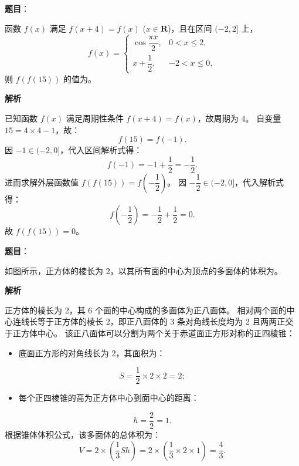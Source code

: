 \begin{answer}

\textbf{题目}：

函数 $f(x)$ 满足 $f(x + 4) = f(x)$ ($x \in \mathbf{R}$)，且在区间 $(-2, 2]$ 上，
\nopagebreak[4]
\[f(x) = \begin{cases} \cos\dfrac{\pi x}{2}, & 0 < x \leqslant 2, \\ x + \dfrac{1}{2}, & -2 < x \leqslant 0, \end{cases}\]
则 $f(f(15))$ 的值为\gkblank{}。

\textbf{解析}

已知函数 $f(x)$ 满足周期性条件 $f(x + 4) = f(x)$，故周期为 4。
自变量 $15 = 4 \times 4 - 1$，故：
\nopagebreak[4]
\[f(15) = f(-1).\]
因 $-1 \in (-2, 0]$，代入区间解析式得：
\nopagebreak[4]
\[f(-1) = -1 + \frac{1}{2} = -\frac{1}{2}.\]
进而求解外层函数值 $f(f(15)) = f\left(-\dfrac{1}{2}\right)$。
因 $-\dfrac{1}{2} \in (-2, 0]$，代入解析式得：
\nopagebreak[4]
\[f\left(-\frac{1}{2}\right) = -\frac{1}{2} + \frac{1}{2} = 0.\]
故 $f(f(15)) = 0$。


\end{answer}
\begin{answer}

\textbf{题目}：

如图所示，正方体的棱长为 2，以其所有面的中心为顶点的多面体的体积为\gkblank{}。
\nopagebreak[4]
\begin{center}\end{center}
\nopagebreak[4]
\textbf{解析}

正方体的棱长为 2，其 6 个面的中心构成的多面体为正八面体。
相对两个面的中心连线长等于正方体的棱长 2，即正八面体的 3 条对角线长度均为 2 且两两正交于正方体中心。
该正八面体可以分割为两个关于赤道面正方形对称的正四棱锥：
\begin{itemize}
\item 底面正方形的对角线长为 2，其面积为：
\end{itemize}
\nopagebreak[4]
\[S = \frac{1}{2} \times 2 \times 2 = 2;\]
\begin{itemize}
\item 每个正四棱锥的高为正方体中心到面中心的距离：
\end{itemize}
\nopagebreak[4]
\[h = \frac{2}{2} = 1.\]
根据锥体体积公式，该多面体的总体积为：
\nopagebreak[4]
\[V = 2 \times \left(\frac{1}{3} S h\right) = 2 \times \left(\frac{1}{3} \times 2 \times 1\right) = \frac{4}{3}.\]


\end{answer}
